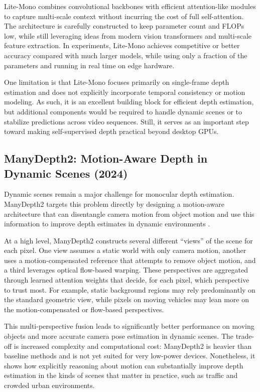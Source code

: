 \documentclass[10pt,twocolumn,letterpaper]{article}
\begin{document}
Lite-Mono combines convolutional backbones with efficient attention-like modules to capture multi-scale context without incurring the cost of full self-attention. The architecture is carefully constructed to keep parameter count and FLOPs low, while still leveraging ideas from modern vision transformers and multi-scale feature extraction. In experiments, Lite-Mono achieves competitive or better accuracy compared with much larger models, while using only a fraction of the parameters and running in real time on edge hardware.

One limitation is that Lite-Mono focuses primarily on single-frame depth estimation and does not explicitly incorporate temporal consistency or motion modeling. As such, it is an excellent building block for efficient depth estimation, but additional components would be required to handle dynamic scenes or to stabilize predictions across video sequences. Still, it serves as an important step toward making self-supervised depth practical beyond desktop GPUs.

\subsection{ManyDepth2: Motion-Aware Depth in Dynamic Scenes (2024)}

Dynamic scenes remain a major challenge for monocular depth estimation. ManyDepth2 targets this problem directly by designing a motion-aware architecture that can disentangle camera motion from object motion and use this information to improve depth estimates in dynamic environments \cite{zhou2024manydepth2}.

At a high level, ManyDepth2 constructs several different ``views'' of the scene for each pixel. One view assumes a static world with only camera motion, another uses a motion-compensated reference that attempts to remove object motion, and a third leverages optical flow-based warping. These perspectives are aggregated through learned attention weights that decide, for each pixel, which perspective to trust most. For example, static background regions may rely predominantly on the standard geometric view, while pixels on moving vehicles may lean more on the motion-compensated or flow-based perspectives.

This multi-perspective fusion leads to significantly better performance on moving objects and more accurate camera pose estimation in dynamic scenes. The trade-off is increased complexity and computational cost: ManyDepth2 is heavier than baseline methods and is not yet suited for very low-power devices. Nonetheless, it shows how explicitly reasoning about motion can substantially improve depth estimation in the kinds of scenes that matter in practice, such as traffic and crowded urban environments.
\end{document}
